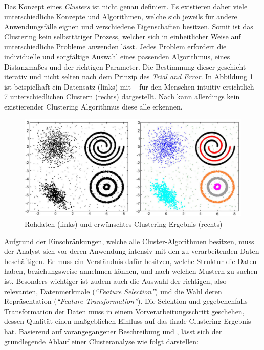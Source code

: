 Das Konzept eines \textit{Clusters} ist nicht genau definiert. Es existieren daher viele unterschiedliche Konzepte
und Algorithmen, welche sich jeweils für andere Anwendungsfälle eignen und verschiedene Eigenschaften
besitzen. Somit ist das Clustering kein selbsttätiger Prozess, welcher sich in
einheitlicher Weise auf unterschiedliche Probleme anwenden lässt. Jedes Problem erfordert die individuelle und sorgfältige
Auswahl eines passenden Algorithmus, eines Distanzmaßes und der richtigen Parameter. Die Bestimmung dieser geschieht
iterativ und nicht selten nach dem Prinzip des \textit{Trial and Error}. In Abbildung \ref{fig:grund_clustering_example}
ist beispielhaft ein Datensatz (links) mit -- für den Menschen intuitiv ersichtlich -- 7 unterschiedlichen Clustern (rechts)
dargestellt. Nach \cite[]{Jain2010} kann allerdings kein existierender Clustering Algorithmus diese alle erkennen.
\cite[]{Jain1999, tan2007introduction}

\begin{figure}[H]
    \centering
    \includegraphics[width=0.8\linewidth]{resources/img/grundlagen/clustering_example}
    \caption[Rohdaten (links) und erwünschtes Clustering-Ergebnis (rechts)]{Rohdaten (links) und erwünschtes Clustering-Ergebnis (rechts) \cite[]{Jain2010}}
    \label{fig:grund_clustering_example}
\end{figure}

Aufgrund der Einschränkungen, welche alle Cluster-Algorithmen besitzen, muss der Analyst sich vor deren Anwendung intensiv
mit den zu verarbeitenden Daten beschäftigen. Er muss ein Verständnis dafür besitzen, welche Struktur die Daten
haben, beziehungsweise annehmen können, und nach welchen Mustern zu suchen ist.
Besonders wichtiger ist zudem auch die Auswahl der richtigen, also relevanten, Datenmerkmale (\textit{``Feature Selection''})
und die Wahl deren Repräsentation (\textit{``Feature Transformation''}).
Die Selektion und gegebenenfalls Transformation der Daten muss in einem
Vorverarbeitungsschritt geschehen, dessen Qualität einen maßgeblichen Einfluss auf das finale Clustering-Ergebnis hat.
Basierend auf vorangegangener Beschreibung und \cite[]{Jain1999}, lässt sich der grundlegende Ablauf einer Clusteranalyse wie folgt darstellen: \\

